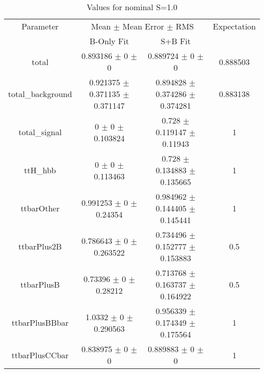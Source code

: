 \begin{table}
\centering
\caption{Values for nominal S=1.0}
\begin{tabular}{cccc}
\toprule
Parameter & \multicolumn{2}{c}{Mean $\pm$ Mean Error $\pm$ RMS} & Expectation\\
 & B-Only Fit & S+B Fit & \\
\midrule
total & \num{0.893186} $\pm$ \num{0} $\pm$ \num{0} & \num{0.889724} $\pm$ \num{0} $\pm$ \num{0} & \num{0.888503}\\
total\_background & \num{0.921375} $\pm$ \num{0.371135} $\pm$ \num{0.371147} & \num{0.894828} $\pm$ \num{0.374286} $\pm$ \num{0.374281} & \num{0.883138}\\
total\_signal & \num{0} $\pm$ \num{0} $\pm$ \num{0.103824} & \num{0.728} $\pm$ \num{0.119147} $\pm$ \num{0.11943} & \num{1}\\
ttH\_hbb & \num{0} $\pm$ \num{0} $\pm$ \num{0.113463} & \num{0.728} $\pm$ \num{0.134883} $\pm$ \num{0.135665} & \num{1}\\
ttbarOther & \num{0.991253} $\pm$ \num{0} $\pm$ \num{0.24354} & \num{0.984962} $\pm$ \num{0.144405} $\pm$ \num{0.145441} & \num{1}\\
ttbarPlus2B & \num{0.786643} $\pm$ \num{0} $\pm$ \num{0.263522} & \num{0.734496} $\pm$ \num{0.152777} $\pm$ \num{0.153883} & \num{0.5}\\
ttbarPlusB & \num{0.73396} $\pm$ \num{0} $\pm$ \num{0.28212} & \num{0.713768} $\pm$ \num{0.163737} $\pm$ \num{0.164922} & \num{0.5}\\
ttbarPlusBBbar & \num{1.0332} $\pm$ \num{0} $\pm$ \num{0.290563} & \num{0.956339} $\pm$ \num{0.174349} $\pm$ \num{0.175564} & \num{1}\\
ttbarPlusCCbar & \num{0.838975} $\pm$ \num{0} $\pm$ \num{0} & \num{0.889883} $\pm$ \num{0} $\pm$ \num{0} & \num{1}\\
\bottomrule
\end{tabular}
\end{table}